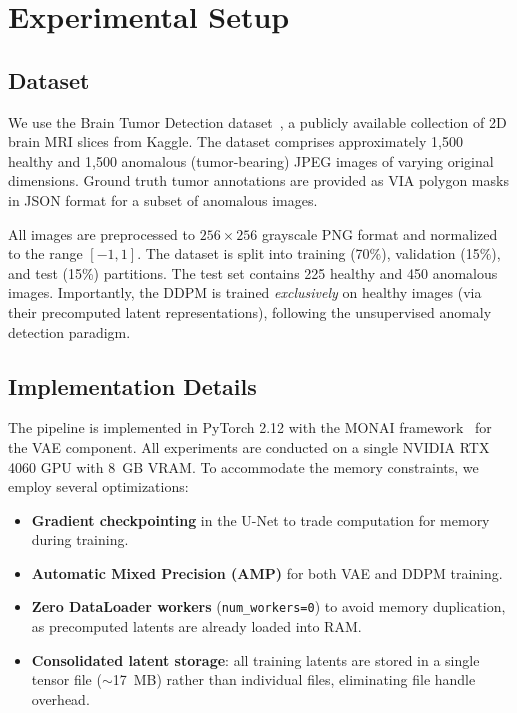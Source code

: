 \section{Experimental Setup}
\label{sec:experiments}

\subsection{Dataset}
\label{sec:dataset}

We use the Brain Tumor Detection dataset~\cite{bhuvaji2020brain}, a publicly available collection of 2D brain MRI slices from Kaggle. The dataset comprises approximately 1,500 healthy and 1,500 anomalous (tumor-bearing) JPEG images of varying original dimensions. Ground truth tumor annotations are provided as VIA polygon masks in JSON format for a subset of anomalous images.

All images are preprocessed to $256 \times 256$ grayscale PNG format and normalized to the range $[-1, 1]$. The dataset is split into training (70\%), validation (15\%), and test (15\%) partitions. The test set contains 225 healthy and 450 anomalous images. Importantly, the DDPM is trained \textit{exclusively} on healthy images (via their precomputed latent representations), following the unsupervised anomaly detection paradigm.

\subsection{Implementation Details}
\label{sec:implementation}

The pipeline is implemented in PyTorch 2.12 with the MONAI framework~\cite{monai2022} for the VAE component. All experiments are conducted on a single NVIDIA RTX 4060 GPU with 8~GB VRAM. To accommodate the memory constraints, we employ several optimizations:

\begin{itemize}[leftmargin=*]
  \item \textbf{Gradient checkpointing} in the U-Net to trade computation for memory during training.
  \item \textbf{Automatic Mixed Precision (AMP)} for both VAE and DDPM training.
  \item \textbf{Zero DataLoader workers} (\texttt{num\_workers=0}) to avoid memory duplication, as precomputed latents are already loaded into RAM.
  \item \textbf{Consolidated latent storage}: all training latents are stored in a single tensor file ($\sim$17~MB) rather than individual files, eliminating file handle overhead.
\end{itemize}

